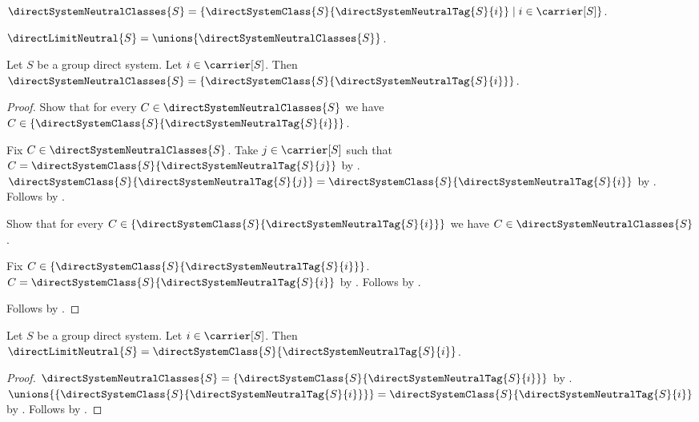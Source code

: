 \begin{definition}\label{direct_system_neutral_classes}
    $\directSystemNeutralClasses{S}=
        \{\directSystemClass{S}{\directSystemNeutralTag{S}{i}}
            \mid i\in\carrier[S]\}$.
\end{definition}

\begin{definition}\label{group_direct_limit_neutral}
    $\directLimitNeutral{S}=\unions{\directSystemNeutralClasses{S}}$.
\end{definition}

\begin{lemma}\label{direct_system_neutral_classes_singleton}
    Let $S$ be a group direct system.
    Let $i\in\carrier[S]$.
    Then $\directSystemNeutralClasses{S}=
        \{\directSystemClass{S}{\directSystemNeutralTag{S}{i}}\}$.
\end{lemma}
\begin{proof}
    Show that for every $C\in\directSystemNeutralClasses{S}$ we have
        $C\in\{\directSystemClass{S}{\directSystemNeutralTag{S}{i}}\}$.
    \begin{subproof}
        Fix $C\in\directSystemNeutralClasses{S}$.
        Take $j\in\carrier[S]$ such that
            $C=\directSystemClass{S}{\directSystemNeutralTag{S}{j}}$ by
            .
        $\directSystemClass{S}{\directSystemNeutralTag{S}{j}}
            =\directSystemClass{S}{\directSystemNeutralTag{S}{i}}$ by
            .
        Follows by .
    \end{subproof}
    Show that for every
        $C\in\{\directSystemClass{S}{\directSystemNeutralTag{S}{i}}\}$
        we have $C\in\directSystemNeutralClasses{S}$.
    \begin{subproof}
        Fix $C\in
            \{\directSystemClass{S}{\directSystemNeutralTag{S}{i}}\}$.
        $C=\directSystemClass{S}{\directSystemNeutralTag{S}{i}}$ by
            .
        Follows by .
    \end{subproof}
    Follows by .
\end{proof}

\begin{proposition}\label{direct_limit_neutral_is_stage_class}
    Let $S$ be a group direct system.
    Let $i\in\carrier[S]$.
    Then $\directLimitNeutral{S}=
        \directSystemClass{S}{\directSystemNeutralTag{S}{i}}$.
\end{proposition}
\begin{proof}
    $\directSystemNeutralClasses{S}=
        \{\directSystemClass{S}{\directSystemNeutralTag{S}{i}}\}$ by
        .
    $\unions{\{\directSystemClass{S}{\directSystemNeutralTag{S}{i}}\}}
        =\directSystemClass{S}{\directSystemNeutralTag{S}{i}}$ by
        .
    Follows by .
\end{proof}

